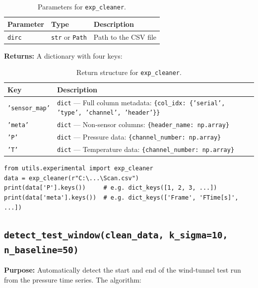 \documentclass[11pt, letterpaper]{article}
\begin{document}
\begin{table}[h!]
\centering
\caption{Parameters for \texttt{exp\_cleaner}.}
\begin{tabular}{@{}lll@{}}
\toprule
\textbf{Parameter} & \textbf{Type} & \textbf{Description} \\
\midrule
\texttt{dirc} & \texttt{str} or \texttt{Path} & Path to the CSV file \\
\bottomrule
\end{tabular}
\end{table}

\textbf{Returns:} A dictionary with four keys:

\begin{table}[h!]
\centering
\caption{Return structure for \texttt{exp\_cleaner}.}
\begin{tabular}{@{}lp{10cm}@{}}
\toprule
\textbf{Key} & \textbf{Description} \\
\midrule
\texttt{'sensor\_map'} & \texttt{dict} --- Full column metadata: \texttt{\{col\_idx: \{'serial', 'type', 'channel', 'header'\}\}} \\
\texttt{'meta'}        & \texttt{dict} --- Non-sensor columns: \texttt{\{header\_name: np.array\}} \\
\texttt{'P'}           & \texttt{dict} --- Pressure data: \texttt{\{channel\_number: np.array\}} \\
\texttt{'T'}           & \texttt{dict} --- Temperature data: \texttt{\{channel\_number: np.array\}} \\
\bottomrule
\end{tabular}
\end{table}

\begin{lstlisting}[caption={Basic usage of \texttt{exp\_cleaner}.}]
from utils.experimental import exp_cleaner
data = exp_cleaner(r"C:\...\Scan.csv")
print(data['P'].keys())     # e.g. dict_keys([1, 2, 3, ...])
print(data['meta'].keys())  # e.g. dict_keys(['Frame', 'FTime[s]', ...])
\end{lstlisting}

\subsection{\texttt{detect\_test\_window(clean\_data, k\_sigma=10, n\_baseline=50)}}
\label{subsec:detect_test_window}

\textbf{Purpose:} Automatically detect the start and end of the
wind-tunnel test run from the pressure time series. The algorithm:
\end{document}
